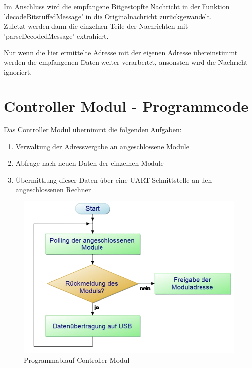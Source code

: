 

Im Anschluss wird die empfangene Bitgestopfte Nachricht in der Funktion 'decodeBitstuffedMessage' in die Originalnachricht zurückgewandelt.\\



Zuletzt werden dann die einzelnen Teile der Nachrichten mit 'parseDecodedMessage' extrahiert.



Nur wenn die hier ermittelte Adresse mit der eigenen Adresse übereinstimmt werden die empfangenen Daten weiter verarbeitet, ansonsten wird die Nachricht ignoriert.   

\newpage
\section{Controller Modul - Programmcode}
Das Controller Modul übernimmt die folgenden Aufgaben:
\begin{enumerate}
    \item Verwaltung der Adressvergabe an angeschlossene Module
    \item Abfrage nach neuen Daten der einzelnen Module
    \item Übermittlung dieser Daten über eine UART-Schnittstelle an den angeschlossenen Rechner
\end{enumerate}

\begin{figure}[H]
	\centering    
	\includegraphics[width=.75\textwidth]{Bilder/pap_hauptmodul.png}
	\caption{Programmablauf Controller Modul}
	\label{Programm_Controller Modul}
\end{figure}
\textmd{
}

